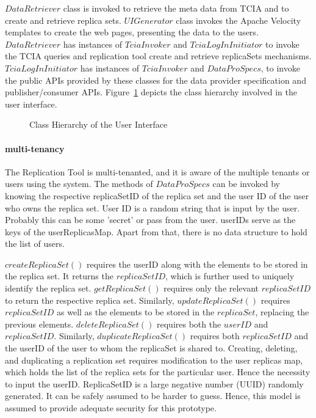 \documentclass[conference]{IEEEtran}
\begin{document}
$DataRetriever$ class is invoked to retrieve the meta data from TCIA and to create and retrieve replica sets. $UIGenerator$ class invokes the Apache Velocity templates to create the web pages, presenting the data to the users. $DataRetriever$ has instances of $TciaInvoker$ and $TciaLogInInitiator$ to invoke the TCIA queries and replication tool create and retrieve replicaSets mechanisms. $TciaLogInInitiator$ has instances of $TciaInvoker$ and $DataProSpecs$, to invoke the public APIs provided by these classes for the data provider specification and publisher/consumer APIs. Figure~\ref{fig:classUX} depicts the class hierarchy involved in the user interface.
\begin{figure}[!htbp]
\begin{center}
\end{center}
 \caption{Class Hierarchy of the User Interface}
 \label{fig:classUX}
\end{figure}


\paragraph*{multi-tenancy}
The Replication Tool is multi-tenanted, and it is aware of the multiple tenants or users using the system. The methods of $DataProSpecs$ can be invoked by knowing the respective replicaSetID of the replica set and the user ID of the user who owns the replica set. User ID is a random string that is input by the user. Probably this can be some 'secret' or pass from the user. userIDs serve as the keys of the userReplicasMap. Apart from that, there is no data structure to hold the list of users.

$createReplicaSet()$ requires the userID along with the elements to be stored in the replica set. It returns the $replicaSetID$, which is further used to uniquely identify the replica set. $getReplicaSet()$ requires only the relevant $replicaSetID$ to return the respective replica set. Similarly, $updateReplicaSet()$ requires $replicaSetID$ as well as the elements to be stored in the $replicaSet$, replacing the previous elements. $deleteReplicaSet()$ requires both the $userID$ and $replicaSetID$. Similarly, $duplicateReplicaSet()$ requires both $replicaSetID$ and the userID of the user to whom the replicaSet is shared to. Creating, deleting, and duplicating a replication set requires modification to the user replicas map, which holds the list of the replica sets for the particular user. Hence the necessity to input the userID. ReplicaSetID is a large negative number (UUID) randomly generated. It can be safely assumed to be harder to guess. Hence, this model is assumed to provide adequate security for this prototype.
\end{document}
